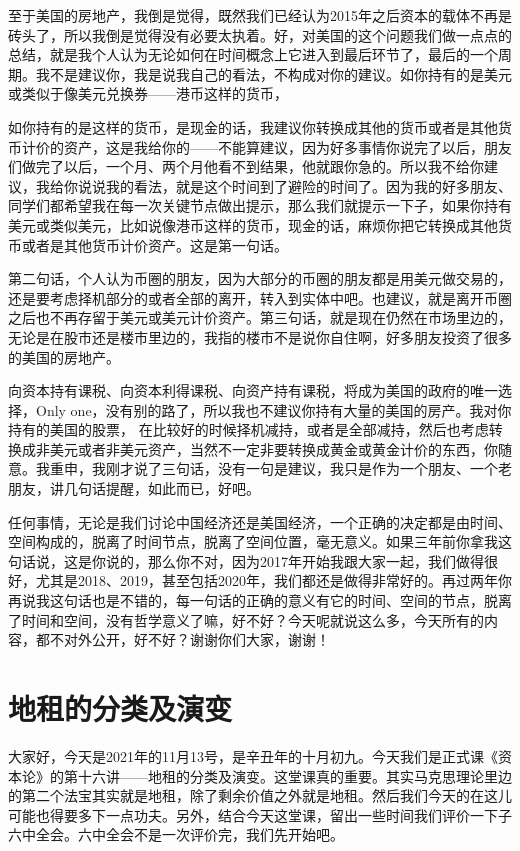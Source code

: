 \documentclass[UTF8, 12pt, a4paper]{ctexrep}
\begin{document}
至于美国的房地产，我倒是觉得，既然我们已经认为2015年之后资本的载体不再是砖头了，所以我倒是觉得没有必要太执着。好，对美国的这个问题我们做一点点的总结，就是我个人认为无论如何在时间概念上它进入到最后环节了，最后的一个周期。我不是建议你，我是说我自己的看法，不构成对你的建议。如你持有的是美元或类似于像美元兑换券——港币这样的货币，

如你持有的是这样的货币，是现金的话，我建议你转换成其他的货币或者是其他货币计价的资产，这是我给你的——不能算建议，因为好多事情你说完了以后，朋友们做完了以后，一个月、两个月他看不到结果，他就跟你急的。所以我不给你建议，我给你说说我的看法，就是这个时间到了避险的时间了。因为我的好多朋友、同学们都希望我在每一次关键节点做出提示，那么我们就提示一下子，如果你持有美元或类似美元，比如说像港币这样的货币，现金的话，麻烦你把它转换成其他货币或者是其他货币计价资产。这是第一句话。

第二句话，个人认为币圈的朋友，因为大部分的币圈的朋友都是用美元做交易的，还是要考虑择机部分的或者全部的离开，转入到实体中吧。也建议，就是离开币圈之后也不再存留于美元或美元计价资产。第三句话，就是现在仍然在市场里边的，无论是在股市还是楼市里边的，我指的楼市不是说你自住啊，好多朋友投资了很多的美国的房地产。

向资本持有课税、向资本利得课税、向资产持有课税，将成为美国的政府的唯一选择，Only one，没有别的路了，所以我也不建议你持有大量的美国的房产。我对你持有的美国的股票， 在比较好的时候择机减持，或者是全部减持，然后也考虑转换成非美元或者非美元资产，当然不一定非要转换成黄金或黄金计价的东西，你随意。我重申，我刚才说了三句话，没有一句是建议，我只是作为一个朋友、一个老朋友，讲几句话提醒，如此而已，好吧。

任何事情，无论是我们讨论中国经济还是美国经济，一个正确的决定都是由时间、空间构成的，脱离了时间节点，脱离了空间位置，毫无意义。如果三年前你拿我这句话说，这是你说的，那么你不对，因为2017年开始我跟大家一起，我们做得很好，尤其是2018、2019，甚至包括2020年，我们都还是做得非常好的。再过两年你再说我这句话也是不错的，每一句话的正确的意义有它的时间、空间的节点，脱离了时间和空间，没有哲学意义了嘛，好不好？今天呢就说这么多，今天所有的内容，都不对外公开，好不好？谢谢你们大家，谢谢！

\section{地租的分类及演变}

大家好，今天是2021年的11月13号，是辛丑年的十月初九。今天我们是正式课《资本论》的第十六讲——地租的分类及演变。这堂课真的重要。其实马克思理论里边的第二个法宝其实就是地租，除了剩余价值之外就是地租。然后我们今天的在这儿可能也得要多下一点功夫。另外，结合今天这堂课，留出一些时间我们评价一下子六中全会。六中全会不是一次评价完，我们先开始吧。
\end{document}
